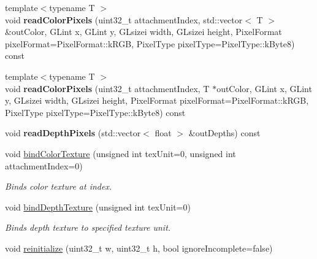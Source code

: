 \begin{Indent}
\begin{DoxyCompactItemize}
\mbox{\label{classrev_1_1_frame_buffer_a7c8d0e6e1c8375b7ac4c2e4f60926a8e}} 
{\footnotesize template$<$typename T $>$ }\\void {\bfseries read\+Color\+Pixels} (uint32\+\_\+t attachment\+Index, std\+::vector$<$ T $>$ \&out\+Color, G\+Lint x, G\+Lint y, G\+Lsizei width, G\+Lsizei height, Pixel\+Format pixel\+Format=Pixel\+Format\+::k\+R\+GB, Pixel\+Type pixel\+Type=Pixel\+Type\+::k\+Byte8) const
\item 
\mbox{\label{classrev_1_1_frame_buffer_af7dc6b25229f7efa4e4da4ce994edd3a}} 
{\footnotesize template$<$typename T $>$ }\\void {\bfseries read\+Color\+Pixels} (uint32\+\_\+t attachment\+Index, T $\ast$out\+Color, G\+Lint x, G\+Lint y, G\+Lsizei width, G\+Lsizei height, Pixel\+Format pixel\+Format=Pixel\+Format\+::k\+R\+GB, Pixel\+Type pixel\+Type=Pixel\+Type\+::k\+Byte8) const
\item 
\mbox{\label{classrev_1_1_frame_buffer_ab1e11f8a2f18fa8cb1016b890966f339}} 
void {\bfseries read\+Depth\+Pixels} (std\+::vector$<$ float $>$ \&out\+Depths) const
\item 
\mbox{\label{classrev_1_1_frame_buffer_ab82a7e5f21e03ac98e9f17bf0bf59434}} 
void \mbox{\hyperlink{classrev_1_1_frame_buffer_ab82a7e5f21e03ac98e9f17bf0bf59434}{bind\+Color\+Texture}} (unsigned int tex\+Unit=0, unsigned int attachment\+Index=0)
\begin{DoxyCompactList}\small\item\em Binds color texture at index. \end{DoxyCompactList}\item 
\mbox{\label{classrev_1_1_frame_buffer_afd3285a413be49fac978b1681914adbd}} 
void \mbox{\hyperlink{classrev_1_1_frame_buffer_afd3285a413be49fac978b1681914adbd}{bind\+Depth\+Texture}} (unsigned int tex\+Unit=0)
\begin{DoxyCompactList}\small\item\em Binds depth texture to specified texture unit. \end{DoxyCompactList}\item 
void \mbox{\hyperlink{classrev_1_1_frame_buffer_ab6415b100449eb4c2332a5a3e9f93d26}{reinitialize}} (uint32\+\_\+t w, uint32\+\_\+t h, bool ignore\+Incomplete=false)

\end{DoxyCompactItemize}
\end{Indent}
